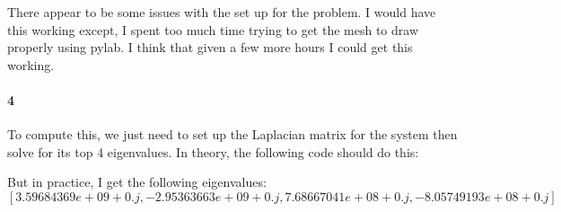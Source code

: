 \documentclass{article}
\begin{document}
There appear to be some issues with the set up for the problem.  I would have this working except, I spent too much time trying to get the mesh to draw properly using pylab. I think that given a few more hours I could get this working.

\paragraph{4}

To compute this, we just need to set up the Laplacian matrix for the system then solve for its top 4 eigenvalues.  In theory, the following code should do this:




But in practice, I get the following eigenvalues:
\[ [ 3.59684369e+09+0.j,  -2.95363663e+09+0.j,   7.68667041e+08+0.j,  -8.05749193e+08+0.j ] \]
\end{document}
